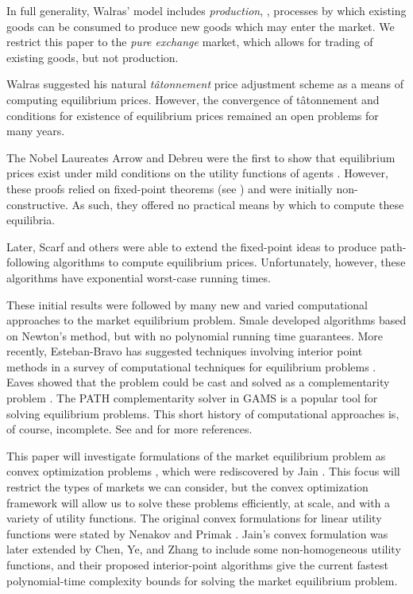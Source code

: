 \documentclass[12pt]{article}
\newcommand{\tatonnement}{t\^atonnement}
\begin{document}
In full generality, Walras' model includes \emph{production}, \ie, processes by
which existing goods can be consumed to produce new goods which may enter the
market. We restrict this paper to the \emph{pure exchange} market, which allows for
trading of existing goods, but not production.

Walras suggested his natural \emph{\tatonnement{}} price adjustment scheme as a
means of computing equilibrium prices. However, the convergence of
\tatonnement{} and conditions for existence of equilibrium prices remained an
open problems for many years.

The Nobel Laureates Arrow and Debreu were the first to show that equilibrium
prices exist under mild conditions on the utility functions of agents
\cite{arrow1954existence}. However, these proofs relied on fixed-point theorems
(see \cite{border1989fixed})
and were initially non-constructive.
As such, they offered no practical means by which to compute these equilibria.

Later, Scarf and others 
\cite{scarf1967approximation,scarf1973computation,
scarf1982computation,eaves1972homotopies} were able to extend the fixed-point
ideas to produce path-following algorithms to compute equilibrium prices.
Unfortunately, however, these algorithms have exponential worst-case running times.

These initial results were followed by many new and varied computational
approaches to the market equilibrium problem.
Smale \cite{smale1976exchange,smale1976convergent} developed algorithms based
on Newton's method, but with no polynomial running time guarantees.
More recently, Esteban-Bravo has suggested techniques involving
interior point methods in a survey of computational techniques
for equilibrium problems \cite{esteban2004computing}.
Eaves \cite{eaves1976finite} showed that the problem could be cast and solved
as a complementarity problem \cite{isac1992complementarity}. The PATH
\cite{ferris2008path,ferris2000complementarity,ferris2000homotopy}
complementarity solver in GAMS \cite{rosenthal2004gams} is a popular tool for
solving equilibrium problems.
This short history of computational approaches is, of course, incomplete.
See \cite{codenotti2008experimental} and \cite{nisan2007algorithmic}
for more references.

This paper will investigate formulations of the market equilibrium problem as
convex optimization problems \cite{BoV:04}, which were rediscovered by Jain
\cite{jain2007polynomial}. This focus will restrict the types of markets we can
consider, but the convex optimization framework will allow us to solve these
problems efficiently, at scale, and with a variety of utility functions. The
original convex formulations for linear utility functions were stated by
Nenakov and Primak \cite{nenakov1983algorithm}. Jain's convex formulation was
later extended by Chen, Ye, and Zhang \cite{chen2007note,
chen2010equilibrium,ye2008path} to include some non-homogeneous utility
functions, and their proposed interior-point algorithms give the current
fastest polynomial-time complexity bounds for solving the market equilibrium
problem.
\end{document}
